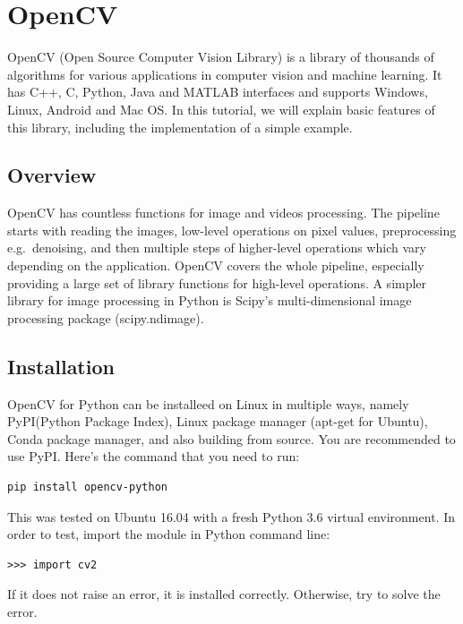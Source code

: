 \chapter{OpenCV}\label{c:opencv}

OpenCV (Open Source Computer Vision Library) is a library of thousands
of algorithms for various applications in computer vision and machine
learning. It has C++, C, Python, Java and MATLAB interfaces and supports
Windows, Linux, Android and Mac OS. In this tutorial, we will explain
basic features of this library, including the implementation of a simple
example.

\section{Overview}\label{overview}

OpenCV has countless functions for image and videos processing. The
pipeline starts with reading the images, low-level operations on pixel
values, preprocessing e.g.~denoising, and then multiple steps of
higher-level operations which vary depending on the application. OpenCV
covers the whole pipeline, especially providing a large set of library
functions for high-level operations. A simpler library for image
processing in Python is Scipy's multi-dimensional image processing
package (scipy.ndimage).

\section{Installation}\label{installation}

OpenCV for Python can be installeed on Linux in multiple ways, namely
PyPI(Python Package Index), Linux package manager (apt-get for Ubuntu),
Conda package manager, and also building from source. You are
recommended to use PyPI. Here's the command that you need to run:

\begin{verbatim}
pip install opencv-python
\end{verbatim}

This was tested on Ubuntu 16.04 with a fresh Python 3.6 virtual
environment. In order to test, import the module in Python command line:

\begin{verbatim}
>>> import cv2
\end{verbatim}

If it does not raise an error, it is installed correctly. Otherwise, try
to solve the error.

